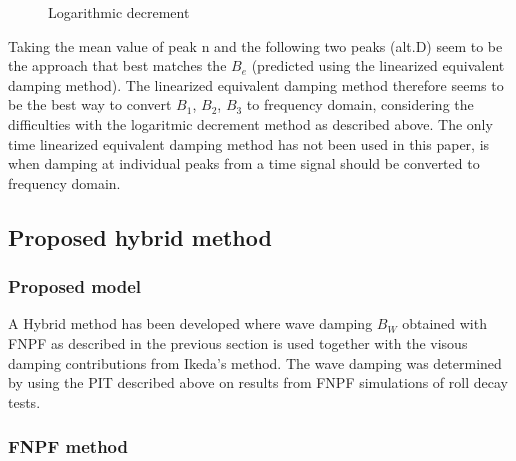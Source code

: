     \begin{figure}
        \begin{center}\end{center}
        \caption{Logarithmic decrement}
        \label{fig:logarithmic_decrement}
    \end{figure}
    
    Taking the mean value of peak n and the following two peaks (alt.D) seem
to be the approach that best matches the \(B_e\) (predicted using the
linearized equivalent damping method). The linearized equivalent damping
method therefore seems to be the best way to convert \(B_1\), \(B_2\),
\(B_3\) to frequency domain, considering the difficulties with the
logaritmic decrement method as described above. The only time linearized
equivalent damping method has not been used in this paper, is when
damping at individual peaks from a time signal should be converted to
frequency domain.

    \subsection{Proposed hybrid method}\label{proposed-hybrid-method}

\subsubsection{Proposed model}\label{proposed-model}

A Hybrid method has been developed where wave damping \(B_W\) obtained
with FNPF as described in the previous section is used together with the
visous damping contributions from Ikeda's method. The wave damping was
determined by using the PIT described above on results from FNPF
simulations of roll decay tests.

\subsubsection{FNPF method}\label{fnpf-method}

    